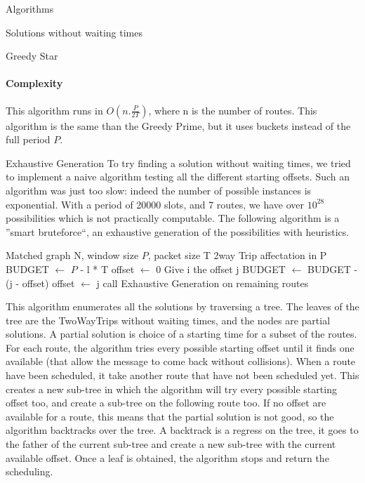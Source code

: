 \documentclass[a4paper,10pt]{report}
\begin{document}
\begin{chapter}{Algorithms}
\begin{section}{Solutions without waiting times}
\begin{subsection}{Greedy Star}
\paragraph{Complexity}
This algorithm runs in $O(n . \frac{P}{2T})$, where n is the number of routes.
This algorithm is the same than the Greedy Prime, but it uses buckets instead of the full period $P$.
\end{subsection}


\begin{subsection}{Exhaustive Generation}
 To try finding a solution without waiting times, we tried to implement a naive algorithm testing all the different starting offsets.
 Such an algorithm was just too slow: indeed the number of possible instances is exponential. With a period of 20000 slots,
 and 7 routes, we have over $10^{28}$ possibilities which is not practically computable.
 The following algorithm is a ''smart bruteforce``, an exhaustive generation of the possibilities with heuristics.
 
\begin{algorithm}[H]
\caption{Exhaustive Generation}
\begin{algorithmic}
\REQUIRE Matched graph N, window size $P$, packet size T
\ENSURE 2way Trip affectation in P
\STATE BUDGET $\leftarrow$ $P$ - l * T
\STATE offset $\leftarrow$ 0
\STATE Give i the offset j
\STATE BUDGET $\leftarrow$ BUDGET - (j - offset)
\STATE offset $\leftarrow$ j
\STATE call Exhaustive Generation on remaining routes
\ENDIF
\ENDFOR
\ENDFOR


\end{algorithmic}
\end{algorithm}

This algorithm enumerates all the solutions by traversing a tree. The leaves of the tree are 
the TwoWayTrips without waiting times, and the nodes are partial solutions. A partial solution is choice of a starting time for a subset of the routes.
For each route, the algorithm tries every possible starting offset until it finds one available (that allow the message to come back without collisions). When a route have been scheduled, it take another route that have not been scheduled yet.
This creates a new sub-tree in which the algorithm will try every possible starting offset too, and create a sub-tree on the following route too.
If no offset are available for a route, this means that the partial solution is not good, so the algorithm backtracks over the tree.
A backtrack is a regress on the tree, it goes to the father of the current sub-tree and create a new sub-tree with the current available offset.
Once a leaf is obtained, the algorithm stops and return the scheduling.


\end{subsection}
\end{section}
\end{chapter}
\end{document}

